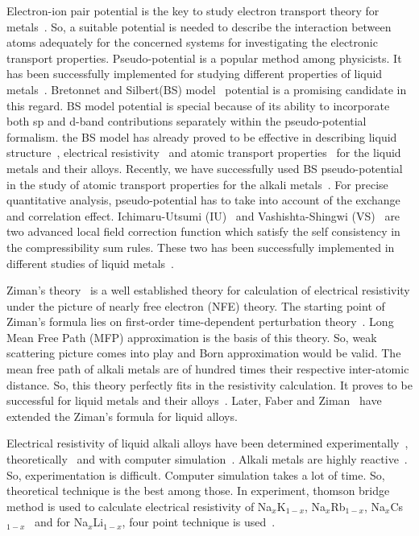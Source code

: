 \documentclass[final12pt]{elsarticle}
\begin{document}
Electron-ion pair potential is the key to study electron transport theory for metals~\cite{Rossiter1991}. So, a suitable potential is needed to describe the interaction between atoms adequately for the concerned systems for investigating the electronic transport properties. Pseudo-potential is a popular method among physicists. It has been successfully implemented for studying different properties of liquid metals~\cite{Fiolhais1996,Fiolhais1995,Sinclair1984,Daw1984,Walter1966,Hohenberg1964,Kohn1965,Mermin1965}. Bretonnet and Silbert(BS) model~\cite{Bret1992} potential is a promising candidate in this regard. BS model potential is special because of its ability to incorporate both sp and d-band contributions separately within the pseudo-potential formalism. the BS model has already proved to be effective in describing liquid structure~\cite{Zahid1999,Khaleque2002}, electrical resistivity~\cite{Sharmin2002} and atomic transport properties~\cite{Bhuiyan2003} for the liquid metals and their alloys. Recently, we have successfully used BS pseudo-potential in the study of atomic transport properties for the alkali metals~\cite{MSU2018}. For precise quantitative analysis, pseudo-potential has to take into account of the exchange and correlation effect. Ichimaru-Utsumi (IU)~\cite{ichimaru} and Vashishta-Shingwi (VS)~\cite{Vashishta1972} are two advanced local field correction function which satisfy the self consistency in the compressibility sum rules. These two has been successfully implemented in different studies of liquid metals~\cite{Gosh2007,MSU2018,Mishra1990,Vora2007}.

Ziman's theory~\cite{ziman1961} is a well established theory for calculation of electrical resistivity under the picture of nearly free electron (NFE) theory. The starting point of Ziman's formula lies on first-order time-dependent perturbation theory~\cite{Baym1964}.
Long Mean Free Path (MFP) approximation is the basis of this theory. So, weak scattering picture comes into play and Born approximation would be valid. The mean free path of alkali metals are of hundred times their respective inter-atomic distance. So, this theory perfectly fits in the resistivity calculation. It proves to be successful for liquid metals and their alloys~\cite{Korkmaz2013, Ziman1963,Mishra1990, Wang1980, Vora2007}. Later, Faber and Ziman~\cite{Faberziman1965} have extended the Ziman's formula for liquid alloys.

Electrical resistivity of liquid alkali alloys have been determined experimentally~\cite{Lugt1978,feitsma1975,Hallers1974}, theoretically~\cite{Korkmaz2013, Mishra1990, Wang1980, Vora2007,Singh1991,Malan2018} and with computer simulation~\cite{Thakur2005}. Alkali metals are highly reactive~\cite{feitsma1975}. So, experimentation is difficult. Computer simulation takes a lot of time. So, theoretical technique is the best among those. In experiment, thomson bridge method is used to calculate electrical resistivity of Na$_x$K$_{1-x}$, Na$_x$Rb$_{1-x}$, Na$_x$Cs$_{1-x}$~\cite{Lugt1978,Hallers1974} and for Na$_x$Li$_{1-x}$, four point technique is used~\cite{feitsma1975}.
\end{document}
